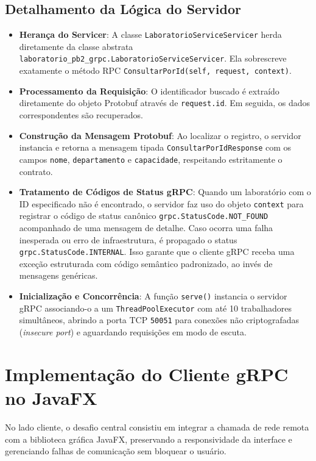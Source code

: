 \documentclass[12pt,a4paper]{article}
\begin{document}
\subsection{Detalhamento da Lógica do Servidor}

\begin{itemize}
    \item \textbf{Herança do Servicer}: A classe \texttt{LaboratorioServiceServicer} herda diretamente da classe abstrata \texttt{laboratorio\_pb2\_grpc.LaboratorioServiceServicer}. Ela sobrescreve exatamente o método RPC \texttt{ConsultarPorId(self, request, context)}.
    \item \textbf{Processamento da Requisição}: O identificador buscado é extraído diretamente do objeto Protobuf através de \texttt{request.id}. Em seguida, os dados correspondentes são recuperados.
    \item \textbf{Construção da Mensagem Protobuf}: Ao localizar o registro, o servidor instancia e retorna a mensagem tipada \texttt{ConsultarPorIdResponse} com os campos \texttt{nome}, \texttt{departamento} e \texttt{capacidade}, respeitando estritamente o contrato.
    \item \textbf{Tratamento de Códigos de Status gRPC}: Quando um laboratório com o ID especificado não é encontrado, o servidor faz uso do objeto \texttt{context} para registrar o código de status canônico \texttt{grpc.StatusCode.NOT\_FOUND} acompanhado de uma mensagem de detalhe. Caso ocorra uma falha inesperada ou erro de infraestrutura, é propagado o status \texttt{grpc.StatusCode.INTERNAL}. Isso garante que o cliente gRPC receba uma exceção estruturada com código semântico padronizado, ao invés de mensagens genéricas.
    \item \textbf{Inicialização e Concorrência}: A função \texttt{serve()} instancia o servidor gRPC associando-o a um \texttt{ThreadPoolExecutor} com até 10 trabalhadores simultâneos, abrindo a porta TCP \texttt{50051} para conexões não criptografadas (\textit{insecure port}) e aguardando requisições em modo de escuta.
\end{itemize}

\section{Implementação do Cliente gRPC no JavaFX}

No lado cliente, o desafio central consistiu em integrar a chamada de rede remota com a biblioteca gráfica JavaFX, preservando a responsividade da interface e gerenciando falhas de comunicação sem bloquear o usuário.
\end{document}
